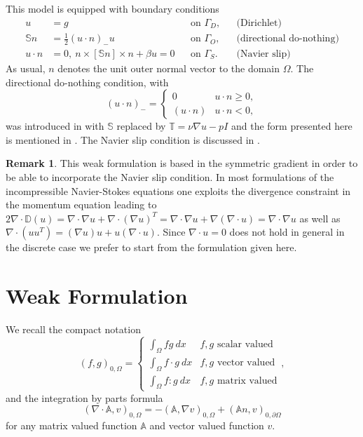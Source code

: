 \documentclass[a4paper,
		     12pt,
		     DIV10,
		     DIVcalc,
		     headings=normal,
		     oneside,
		     bibliography=totoc,
		     headsepline=false,
		     headinclude]{scrartcl}
\theoremstyle{definition}
\newtheorem{Rem}[Def]{Remark}
\begin{document}
This model is equipped with boundary conditions
\begin{subequations}
\begin{align}
u &= g                             &&\text{on $\Gamma_D$}, &&\text{(Dirichlet)}\\
\mathbb{S} n &= \frac12 (u\cdot n)_- u  &&\text{on $\Gamma_O$}, &&\text{(directional do-nothing)}\\
u\cdot n &= 0, \ n\times [\mathbb{S} n] \times n + \beta u = 0 &&\text{on $\Gamma_S$}. &&\text{(Navier slip)}
\end{align}
\end{subequations}
As usual, $n$ denotes the unit outer normal vector to the domain $\Omega$. The directional do-nothing condition, with 
$$(u\cdot n)_- = \left\{\begin{array}{ll}
0 & u\cdot n \geq 0,\\
(u\cdot n) & u\cdot n < 0,
\end{array} \right. $$ was introduced in \cite{Braack2014} with $\mathbb{S}$ replaced
by $\mathbb{T} = \nu \nabla u - pI$ and the form presented here is mentioned in \cite{JohnLectureNotes}.
The Navier slip condition is discussed in \cite{Neustupa2007}.

\begin{Rem}
This weak formulation is based in the symmetric gradient in order to be able to incorporate the
Navier slip condition. In most formulations of the incompressible Navier-Stokes equations one exploits
the divergence constraint in the momentum equation leading to $2\nabla\cdot\mathbb{D}(u) = \nabla\cdot\nabla u + \nabla\cdot(\nabla u)^T
=  \nabla\cdot\nabla u + \nabla(\nabla\cdot u) =  \nabla\cdot\nabla u$ as well as $\nabla\cdot(uu^T) = (\nabla u) u + u (\nabla\cdot u)$. Since 
$\nabla\cdot u = 0$ does not hold in general in the discrete case we prefer to start from the formulation given here.
\end{Rem}

\section{Weak Formulation}

We recall the compact notation $$(f,g)_{0,\Omega} = \left\{\begin{array}{ll}
\int_\Omega fg \ dx & \text{$f,g$ scalar valued}\\
\int_\Omega f\cdot g \ dx & \text{$f,g$ vector valued}\\
\int_\Omega f : g \ dx & \text{$f,g$ matrix valued}
\end{array}\right. ,$$
and the integration by parts formula 
$$(\nabla\cdot\mathbb{A},v)_{0,\Omega} = - (\mathbb{A},\nabla v)_{0,\Omega} + (\mathbb{A}n,v)_{0,\partial\Omega}$$
for any matrix valued function $\mathbb{A}$ and vector valued function $v$.  
\end{document}

